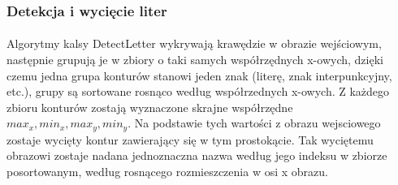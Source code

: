 \documentclass[a4paper,12pt]{article}
\begin{document}
        \subsubsection{Detekcja i wycięcie liter}
            \paragraph{\indent} Algorytmy kalsy DetectLetter wykrywają krawędzie w obrazie wejściowym,     następnie grupują je w zbiory o taki samych współrzędnych x-owych, dzięki    czemu jedna grupa konturów stanowi jeden znak (literę, znak                 interpunkcyjny, etc.), grupy są sortowane rosnąco według współrzednych      x-owych. Z każdego zbioru konturów zostają wyznaczone skrajne współrzędne    $ max_{x} , min_{x}, max_{y}, min_{y} $. Na podstawie tych wartości z       obrazu wejsciowego zostaje wycięty kontur zawierający się w tym             prostokącie. Tak wyciętemu obrazowi zostaje nadana jednoznaczna nazwa       według jego indeksu w zbiorze posortowanym, według rosnącego rozmieszczenia w osi x obrazu. 
    
\end{document}
